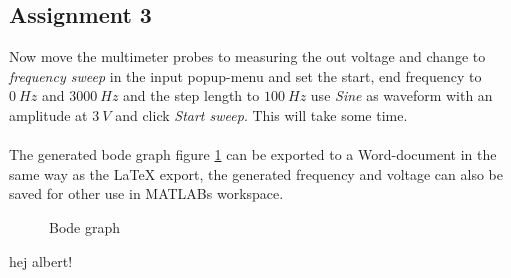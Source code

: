 \subsection{Assignment 3}
Now move the multimeter probes to measuring the out voltage and change to \emph{frequency sweep} in the input popup-menu and set the start, end frequency to $0~Hz$ and $3000~Hz$ and the step length to $100~Hz$ use \emph{Sine} as waveform with an amplitude at $3~V$ and click \emph{Start sweep}. This will take some time.\\
\\
The generated bode graph figure \ref{bode} can be exported to a Word-document in the same way as the LaTeX export, the generated frequency and voltage can also be saved for other use in MATLABs workspace. 
\begin{center}
	\begin{figure}[h]
		\caption{Bode graph}
		\label{bode}
	\end{figure}
\end{center}

hej albert! 
   

\ifdefined\master
\else
	
\fi